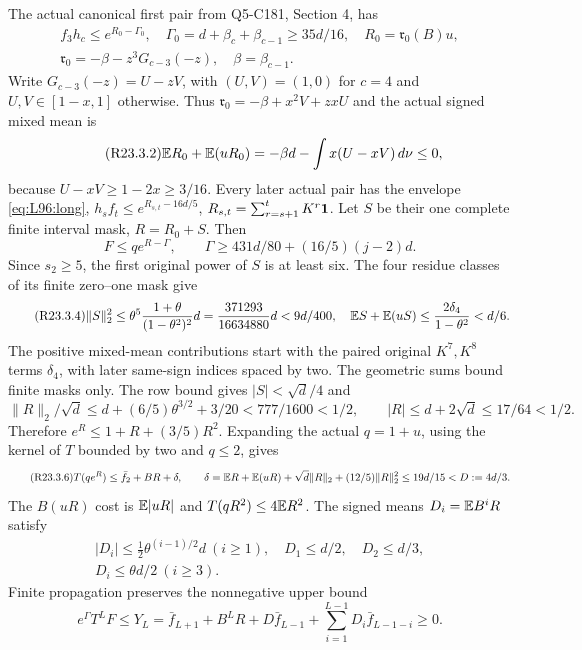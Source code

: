 The actual canonical first pair from Q5-C181, Section 4, has
\begin{equation}\tag{R23.3.1}\label{eq:R23:firstpair}
\begin{gathered}
f_3h_c\le e^{R_0-\Gamma_0},\quad \Gamma_0=d+\beta_c+\beta_{c-1}\ge35d/16,\quad R_0=\mathfrak r_0(B)u,\\
\mathfrak r_0=-\beta-z^3G_{c-3}(-z),\quad \beta=\beta_{c-1}.
\end{gathered}
\end{equation}
Write $G_{c-3}(-z)=U-zV$, with $(U,V)=(1,0)$ for $c=4$ and
$U,V\in[1-x,1]$ otherwise. Thus
$\mathfrak r_0=-\beta+x^2V+zxU$ and the actual signed mixed mean is
\begin{equation}\tag{R23.3.2}\label{eq:R23:mixedmean}
\mathbb E R_0+\mathbb E(uR_0)=-\beta d-\int x(U-xV)\,d\nu\le0,
\end{equation}
because $U-xV\ge1-2x\ge3/16$.
Every later actual pair has the envelope \eqref{eq:L96:long},
$h_sf_t\le e^{R_{s,t}-16d/5}$,
$R_{s,t}=\sum_{r=s+1}^tK^r\mathbf1$.
Let $S$ be their one complete finite interval mask, $R=R_0+S$.
Then
\[
F\le qe^{R-\Gamma},\qquad
\Gamma\ge431d/80+(16/5)(j-2)d.
\]
Since $s_2\ge5$, the first original power of $S$ is at least six.
The four residue classes of its finite zero--one mask give
\begin{equation}\tag{R23.3.4}\label{eq:R23:mask}
\|S\|_2^2\le\theta^5\frac{1+\theta}{(1-\theta^2)^2}d
=\frac{371293}{16634880}d<9d/400,\quad
\mathbb E S+\mathbb E(uS)\le\frac{2\delta_4}{1-\theta^2}<d/6.
\end{equation}
The positive mixed-mean contributions start with the paired original
$K^7,K^8$ terms $\delta_4$, with later same-sign indices spaced by two.
The geometric sums bound finite masks only. The row bound gives
$|S|<\sqrt d/4$ and
\[
\|R\|_2/\sqrt d\le d+(6/5)\theta^{3/2}+3/20
<777/1600<1/2,\qquad |R|\le d+2\sqrt d\le17/64<1/2.
\]
Therefore $e^R\le1+R+(3/5)R^2$. Expanding the actual $q=1+u$,
using the kernel of $T$ bounded by two and $q\le2$, gives
\begin{equation}\tag{R23.3.6}\label{eq:R23:firstrow}
T(qe^R)\le\bar f_2+BR+\delta,\qquad
\delta=\mathbb E R+\mathbb E(uR)+\sqrt d\|R\|_2+(12/5)\|R\|_2^2
\le19d/15<D:=4d/3.
\end{equation}
The $B(uR)$ cost is $\mathbb E|uR|$ and $T(qR^2)\le4\mathbb E R^2$.
The signed means $D_i=\mathbb E B^iR$ satisfy
\begin{equation}\tag{R23.3.7}\label{eq:R23:signed}
\begin{gathered}
|D_i|\le\tfrac12\theta^{(i-1)/2}d\ (i\ge1),\quad D_1\le d/2,\quad D_2\le d/3,\\
D_i\le\theta d/2\ (i\ge3).
\end{gathered}
\end{equation}
Finite propagation preserves the nonnegative upper bound
\begin{equation}\tag{R23.3.8}\label{eq:R23:propagation}
e^\Gamma T^LF\le Y_L=\bar f_{L+1}+B^LR+D\bar f_{L-1}
+\sum_{i=1}^{L-1}D_i\bar f_{L-1-i}\ge0.
\end{equation}

